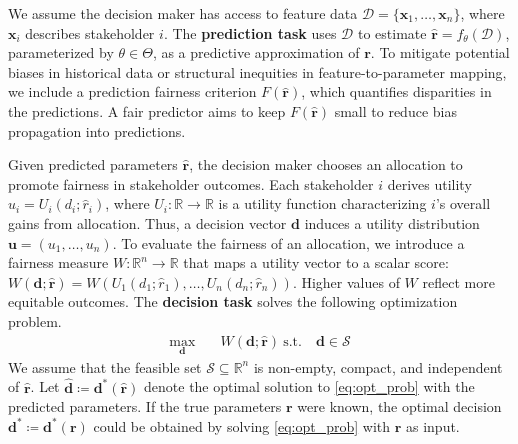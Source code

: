 \documentclass[ijoc,sglanonrev]{informs4}
\begin{document}
We assume the decision maker has access to feature data 
$\mathcal{D} = \{\mathbf{x}_1, \dots, \mathbf{x}_n\}$, where $\mathbf{x}_i$ describes stakeholder $i$. The \textbf{prediction task} uses $\mathcal{D}$ to estimate $\hat{\mathbf{r}} = f_{\theta}(\mathcal{D})$, parameterized by $\theta \in \Theta$, as a predictive approximation of $\mathbf{r}$. To mitigate potential biases in historical data or structural inequities in feature-to-parameter mapping, we include a prediction fairness criterion $F(\hat{\mathbf{r}})$, which quantifies disparities in the predictions. A fair predictor aims to keep $F(\hat{\mathbf{r}})$ small to reduce bias propagation into predictions. 

Given predicted parameters $\hat{\mathbf{r}}$, the decision maker chooses an allocation to promote fairness in stakeholder outcomes. Each stakeholder $i$ derives utility $u_i = U_i(d_i;\hat{r}_i)$, where $U_i: \mathbb{R} \rightarrow \mathbb{R}$ is a utility function characterizing $i$'s overall gains from allocation. Thus, a decision vector $\mathbf{d}$ induces a utility distribution $\mathbf{u} = (u_1,\ldots,u_n)$.
To evaluate the fairness of an allocation, we introduce a fairness measure $W: \mathbb{R}^n \to \mathbb{R}$ that maps a utility vector to a scalar score: $W(\mathbf{d};\hat{\mathbf{r}}) = W(U_1(d_1;\hat{r}_1),\ldots,U_n(d_n;\hat{r}_n))$. Higher values of $W$ reflect more equitable outcomes. The \textbf{decision task} solves the following optimization problem. 
\begin{equation} \label{eq:opt_prob}
\begin{aligned}
\max_{\mathbf{d}} \quad & W(\mathbf{d};\hat{\mathbf{r}}) ~ \text{s.t.} \quad \mathbf{d} \in \mathcal{S}
\end{aligned}
\end{equation}
We assume that the feasible set $\mathcal{S} \subseteq \mathbb{R}^{n}$ is non-empty, compact, and independent of $\hat{\mathbf{r}}$. Let $\hat{\mathbf{d}} \coloneqq \mathbf{d^*}(\hat{\mathbf{r}})$ denote the optimal solution to \eqref{eq:opt_prob} with the predicted parameters. If the true parameters $\mathbf{r}$ were known, the optimal decision $\mathbf{d^*} \coloneqq \mathbf{d^*}(\mathbf{r})$ could be obtained by solving \eqref{eq:opt_prob} with $\mathbf{r}$ as input.
\end{document}
